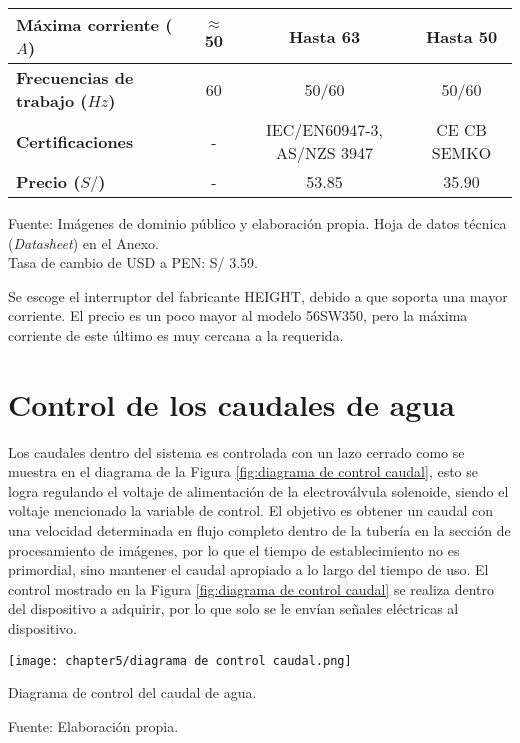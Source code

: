 \begin{mytable}[H]
\begin{tabular}{l|c|c|c|}
		\multicolumn{1}{|l|}{\textbf{Máxima corriente ($A$)}} & $\approx$ 50 & Hasta 63 & Hasta 50 \\ \hline
		\multicolumn{1}{|l|}{\textbf{Frecuencias de trabajo ($Hz$)}} & 60 & 50/60 & 50/60  \\ \hline
		\multicolumn{1}{|l|}{\textbf{Certificaciones}} & - & IEC/EN60947-3, AS/NZS 3947 & CE CB SEMKO \\ \hline
		\multicolumn{1}{|l|}{\textbf{Precio ($S/$)}} & - & 53.85 & 35.90 \\ \hline
	\end{tabular}
	\begin{myflushcenteraftertable}	
		Fuente: Imágenes de dominio público y elaboración propia. Hoja de datos técnica (\textit{Datasheet}) en el Anexo.\\
		Tasa de cambio de USD a PEN: S/ 3.59.
	\end{myflushcenteraftertable}
\end{mytable}

Se escoge el interruptor del fabricante HEIGHT, debido a que soporta una mayor corriente. El precio es un poco mayor al modelo 56SW350, pero la máxima corriente de este último es muy cercana a la requerida.

\section{Control de los caudales de agua}

Los caudales dentro del sistema es controlada con un lazo cerrado como se muestra en el diagrama de la Figura \ref{fig:diagrama de control caudal}, esto se logra regulando el voltaje de alimentación de la electroválvula solenoide, siendo el voltaje mencionado la variable de control. El objetivo es obtener un caudal con una velocidad determinada en flujo completo dentro de la tubería en la sección de procesamiento de imágenes, por lo que el tiempo de establecimiento no es primordial, sino mantener el caudal apropiado a lo largo del tiempo de uso. El control mostrado en la Figura \ref{fig:diagrama de control caudal} se realiza dentro del dispositivo a adquirir, por lo que solo se le envían señales eléctricas al dispositivo.

\begin{myfigure}[H]
	\footnotesize\centering
	\texttt{[image: chapter5/diagrama de control caudal.png]}
	\caption{Diagrama de control del caudal de agua.}
	\begin{myflushcenter}
		Fuente: Elaboración propia.
	\end{myflushcenter}
	\label{fig:diagrama de control caudal}
\end{myfigure}

